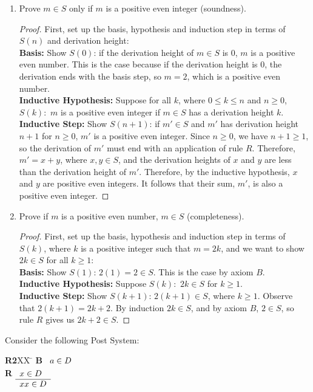 \documentclass[]{exam}
\theoremstyle{definition}
\begin{document}
\begin{questions}
\begin{enumerate}[label=\alph*)]
\item Prove $m \in S$ only if $m$ is a positive even integer (soundness). 
\begin{proof}
First, set up the basis, hypothesis and induction step in terms of $S(n)$ and
derivation height:
~\\
\textbf{Basis:} Show $S(0)$: if the derivation height of $m \in S$ is $0$, $m$ is a
positive even number. This is the case because if the derivation height is $0$,
the derivation ends with the basis step, so $m = 2$, which is a positive even
number.
~\\
\textbf{Inductive Hypothesis:} Suppose for all $k$, where $0 \leq k \leq n$ and
$n \geq 0$, $S(k):$ $m$ is a positive even integer if $m \in S$ has a derivation
height $k$.
~\\
\textbf{Inductive Step:} Show $S(n+1)$: if $m' \in S$ and $m'$ has derivation
height $n + 1$ for $n \geq 0$, $m'$ is a positive even integer. Since $n \geq 0$,
we have $n + 1 \geq 1$, so the derivation of $m'$ must end with an application of
rule $R$. Therefore, $m' = x + y$, where $x,y \in S$, and the derivation heights
of $x$ and $y$ are less than the derivation height of $m'$. Therefore, by the
inductive hypothesis, $x$ and $y$ are positive even integers. It follows that
their sum, $m'$, is also a positive even integer.

\end{proof}
\item Prove if $m$ is a positive even number, $m \in S$ (completeness).
\begin{proof}
First, set up the basis, hypothesis and induction step in terms of $S(k)$,
where $k$ is a positive integer such that $m = 2k$, and we want to show
$2k \in S$ for all $k \geq 1$:
~\\
\textbf{Basis:} Show $S(1)$: $2(1) = 2 \in S$. This is the case by axiom $B$.
~\\
\textbf{Inductive Hypothesis:} Suppose $S(k):$ $2k \in S$ for $k \geq 1$.
~\\
\textbf{Inductive Step:} Show $S(k+1)$: $2(k+1) \in S$, where $k \geq 1$.
Observe that $2(k + 1) = 2k + 2$. By induction $2k \in S$, and by axiom
$B$, $2 \in S$, so rule $R$ gives us $2k + 2 \in S$.
\end{proof}
\end{enumerate}

\question Consider the following Post System:
\begin{tabbing}
{\bf R2}XX \=  \kill
{\bf B} \>
        \(\begin{array}[t]{l}
        a \in D
        \end{array}\) \\[2ex]
{\bf R} \>
        \(\begin{array}[t]{l}
        x \in D \\
        \hline
        xx \in D
        \end{array}\) 
\end{tabbing}


\end{questions}
\end{document}

